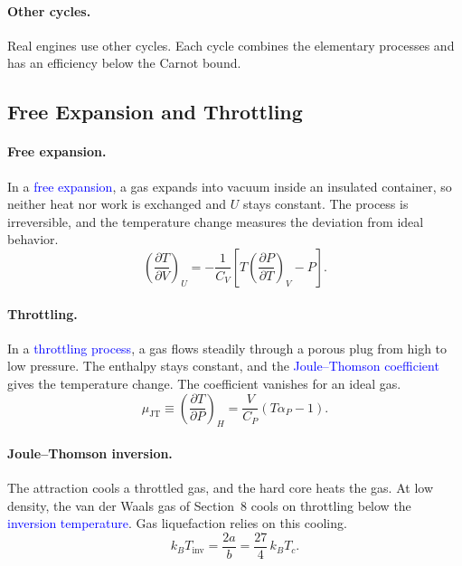 \paragraph{Other cycles.}
Real engines use other cycles. Each cycle combines the elementary processes
and has an efficiency below the Carnot bound.

\subsection{Free Expansion and Throttling}

\paragraph{Free expansion.}
In a \textcolor{blue}{free expansion}, a gas expands into vacuum inside an
insulated container, so neither heat nor work is exchanged and $U$ stays
constant. The process is irreversible, and the temperature change measures
the deviation from ideal behavior.
\begin{equation}
    \boxed{\left(\frac{\partial T}{\partial V}\right)_{\!U}
    =-\frac{1}{C_V}\left[T\left(\frac{\partial P}{\partial T}\right)_{\!V}-P\right].}
\end{equation}

\paragraph{Throttling.}
In a \textcolor{blue}{throttling process}, a gas flows steadily through a
porous plug from high to low pressure. The enthalpy stays constant, and the
\textcolor{blue}{Joule--Thomson coefficient} gives the temperature change.
The coefficient vanishes for an ideal gas.
\begin{equation}
    \boxed{\mu_{\text{JT}}\equiv\left(\frac{\partial T}{\partial P}\right)_{\!H}
    =\frac{V}{C_P}\left(T\alpha_P-1\right).}
\end{equation}

\paragraph{Joule--Thomson inversion.}
The attraction cools a throttled gas, and the hard core heats the gas. At
low density, the van der Waals gas of Section~8 cools on throttling below
the \textcolor{blue}{inversion temperature}. Gas liquefaction relies on
this cooling.
\begin{equation}
    \boxed{k_BT_{\text{inv}}=\frac{2a}{b}=\frac{27}{4}\,k_BT_c.}
\end{equation}
